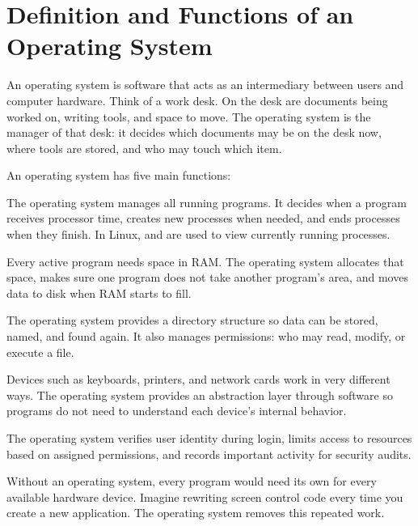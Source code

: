 \section{Definition and Functions of an Operating System}
\label{sec:os-basics}

An operating system is software that acts as an intermediary between users and computer hardware. Think of a work desk. On the desk are documents being worked on, writing tools, and space to move. The operating system is the manager of that desk: it decides which documents may be on the desk now, where tools are stored, and who may touch which item.

An operating system has five main functions:

\begin{description}[noitemsep,topsep=2pt,parsep=0pt]
    \item[Process Management] The operating system manages all running programs. It decides when a program receives processor time, creates new processes when needed, and ends processes when they finish. In Linux,  and  are used to view currently running processes.

    \item[Memory Management] Every active program needs space in RAM. The operating system allocates that space, makes sure one program does not take another program's area, and moves data to disk when RAM starts to fill.

    \item[File Management] The operating system provides a directory structure so data can be stored, named, and found again. It also manages permissions: who may read, modify, or execute a file.

    \item[I/O Management] Devices such as keyboards, printers, and network cards work in very different ways. The operating system provides an abstraction layer through  software so programs do not need to understand each device's internal behavior.

    \item[Security and Protection] The operating system verifies user identity during login, limits access to resources based on assigned permissions, and records important activity for security audits.
\end{description}

\begin{notebox}
Without an operating system, every program would need its own  for every available hardware device. Imagine rewriting screen control code every time you create a new application. The operating system removes this repeated work.
\end{notebox}


